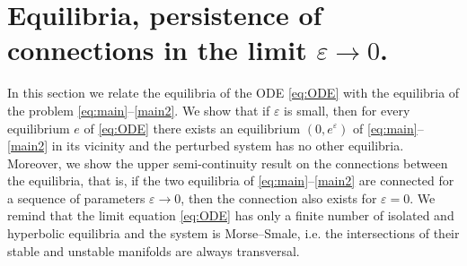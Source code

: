 \documentclass[11pt, leqno]{amsart}
\theoremstyle{definition}
\begin{document}
%
%



\section{Equilibria, persistence of connections in the limit $\varepsilon\to 0$.}\label{equi}
In this section we relate the equilibria of the  ODE \eqref{eq:ODE} with the equilibria of the problem \eqref{eq:main}--\eqref{main2}. We show that if $\varepsilon$ is small, then for every equilibrium $e$ of \eqref{eq:ODE} there exists an equilibrium $(0,e^{\varepsilon})$ of \eqref{eq:main}--\eqref{main2} in its vicinity and the perturbed system has no other equilibria.  Moreover, we show the upper semi-continuity result on the connections between the equilibria, that is, if the two equilibria of \eqref{eq:main}--\eqref{main2} are connected for a sequence of parameters $\varepsilon\to 0$, then the connection also exists for $\varepsilon=0$. We remind that the limit equation \eqref{eq:ODE}
has only a finite number of isolated and hyperbolic equilibria and the system is Morse--Smale, i.e. the intersections of their stable and unstable manifolds are always transversal.
\end{document}
